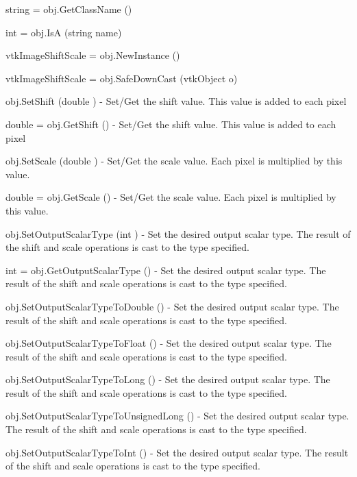 \begin{DoxyItemize}
\item {\ttfamily string = obj.\-Get\-Class\-Name ()}  
\item {\ttfamily int = obj.\-Is\-A (string name)}  
\item {\ttfamily vtk\-Image\-Shift\-Scale = obj.\-New\-Instance ()}  
\item {\ttfamily vtk\-Image\-Shift\-Scale = obj.\-Safe\-Down\-Cast (vtk\-Object o)}  
\item {\ttfamily obj.\-Set\-Shift (double )} -\/ Set/\-Get the shift value. This value is added to each pixel  
\item {\ttfamily double = obj.\-Get\-Shift ()} -\/ Set/\-Get the shift value. This value is added to each pixel  
\item {\ttfamily obj.\-Set\-Scale (double )} -\/ Set/\-Get the scale value. Each pixel is multiplied by this value.  
\item {\ttfamily double = obj.\-Get\-Scale ()} -\/ Set/\-Get the scale value. Each pixel is multiplied by this value.  
\item {\ttfamily obj.\-Set\-Output\-Scalar\-Type (int )} -\/ Set the desired output scalar type. The result of the shift and scale operations is cast to the type specified.  
\item {\ttfamily int = obj.\-Get\-Output\-Scalar\-Type ()} -\/ Set the desired output scalar type. The result of the shift and scale operations is cast to the type specified.  
\item {\ttfamily obj.\-Set\-Output\-Scalar\-Type\-To\-Double ()} -\/ Set the desired output scalar type. The result of the shift and scale operations is cast to the type specified.  
\item {\ttfamily obj.\-Set\-Output\-Scalar\-Type\-To\-Float ()} -\/ Set the desired output scalar type. The result of the shift and scale operations is cast to the type specified.  
\item {\ttfamily obj.\-Set\-Output\-Scalar\-Type\-To\-Long ()} -\/ Set the desired output scalar type. The result of the shift and scale operations is cast to the type specified.  
\item {\ttfamily obj.\-Set\-Output\-Scalar\-Type\-To\-Unsigned\-Long ()} -\/ Set the desired output scalar type. The result of the shift and scale operations is cast to the type specified.  
\item {\ttfamily obj.\-Set\-Output\-Scalar\-Type\-To\-Int ()} -\/ Set the desired output scalar type. The result of the shift and scale operations is cast to the type specified.  

\end{DoxyItemize}
